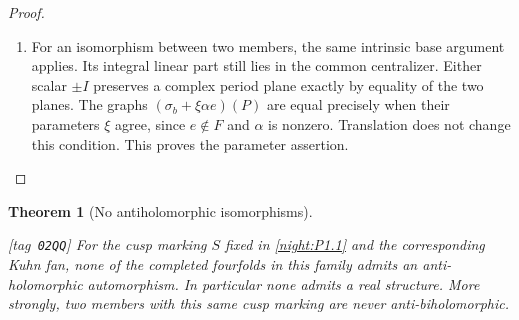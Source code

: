 \documentclass[11pt,a4paper]{article}
\numberwithin{equation}{section}
\newtheorem{theorem}{Theorem}[section]
\theoremstyle{definition}
\newcommand{\StatementRecord}[4]{{\upshape\footnotesize[tag~\texttt{#3}]}\enspace\ignorespaces}
\begin{document}
\begin{proof}
\begin{enumerate}[label=\arabic*.]
\item For an isomorphism between two members, the same intrinsic
base argument applies. Its integral linear part still
lies in the common centralizer. Either scalar $\pm I$
preserves a complex period plane exactly by equality
of the two planes. The graphs
$(\sigma_b+\xi\alpha e)(P)$ are equal precisely when their
parameters $\xi$ agree, since $e\notin F$ and $\alpha$
is nonzero. Translation does not change this condition.
This proves the parameter assertion.

\end{enumerate}
\end{proof}




\begin{theorem}[No antiholomorphic isomorphisms]\hypertarget{tag-02QQ}{}\label{night:P1.17}
\StatementRecord{night:P1.17}{proved}{02QQ}{\cref{night:P1.1,night:P1A.4,night:P1.9}}
For the cusp marking $S$ fixed in \cref{night:P1.1} and the corresponding Kuhn fan,
none of the completed fourfolds in this family admits an
anti-holomorphic automorphism.  In particular none admits a real
structure.  More strongly, two members with this same cusp marking
are never anti-biholomorphic.
\end{theorem}
\end{document}
